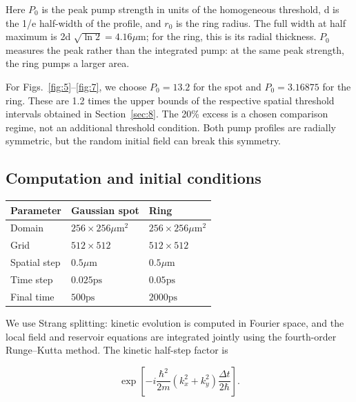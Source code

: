 \documentclass[12pt,a4paper]{article}
\begin{document}
Here $P_{0}$ is the peak pump strength in units of the homogeneous threshold, d is the 1/e half-width of the profile, and $r_{0}$ is the ring radius. The full width at half maximum is 2d $\sqrt{\ln 2}=4.16 \mu\mathrm m$; for the ring, this is its radial thickness. $P_{0}$ measures the peak rather than the integrated pump: at the same peak strength, the ring pumps a larger area.

For Figs.~\ref{fig:5}--\ref{fig:7}, we choose $P_{0}=13.2$ for the spot and $P_{0}=3.16875$ for the ring. These are 1.2 times the upper bounds of the respective spatial threshold intervals obtained in Section~\ref{sec:8}. The 20\% excess is a chosen comparison regime, not an additional threshold condition. Both pump profiles are radially symmetric, but the random initial field can break this symmetry.

\subsection{Computation and initial conditions}\label{sec:5.2}

\begin{center}\small\begin{tabular}{>{\raggedright\arraybackslash}p{}>{\raggedright\arraybackslash}p{}>{\raggedright\arraybackslash}p{}}\toprule
\textbf{Parameter} & \textbf{Gaussian spot} & \textbf{Ring}\\\midrule
Domain & $256\times 256 \mu\mathrm m^{2}$ & $256\times 256 \mu\mathrm m^{2}$\\
Grid & $512\times 512$ & $512\times 512$\\
Spatial step & $0.5 \mu\mathrm m$ & $0.5 \mu\mathrm m$\\
Time step & $0.025 \mathrm{ps}$ & $0.05 \mathrm{ps}$\\
Final time & $500 \mathrm{ps}$ & $2000 \mathrm{ps}$\\
\bottomrule\end{tabular}\end{center}

We use Strang splitting: kinetic evolution is computed in Fourier space, and the local field and reservoir equations are integrated jointly using the fourth-order Runge--Kutta method. The kinetic half-step factor is

\begin{equation}\label{eq:25}
\exp\left[-i\frac{\hbar^2}{2m}(k_x^2+k_y^2)\frac{\Delta t}{2\hbar}\right].\end{equation}
\end{document}
